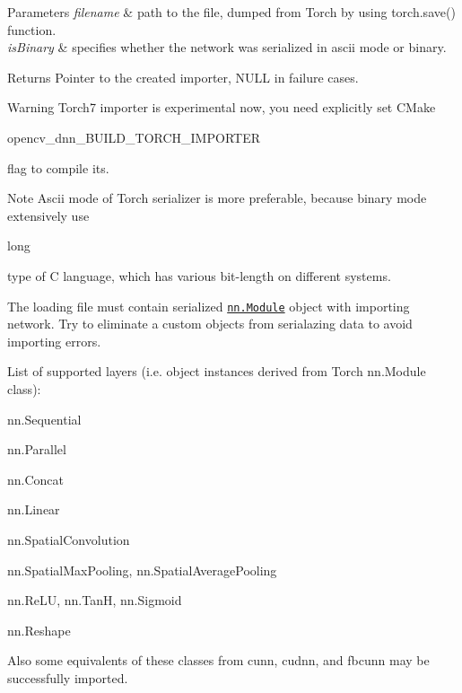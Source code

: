 \begin{DoxyParams}{Parameters}
{\em filename} & path to the file, dumped from Torch by using torch.\+save() function. \\
\hline
{\em is\+Binary} & specifies whether the network was serialized in ascii mode or binary. \\
\hline
\end{DoxyParams}
\begin{DoxyReturn}{Returns}
Pointer to the created importer, N\+U\+LL in failure cases.
\end{DoxyReturn}
\begin{DoxyWarning}{Warning}
Torch7 importer is experimental now, you need explicitly set C\+Make
\begin{DoxyCode}
opencv\_dnn\_BUILD\_TORCH\_IMPORTER 
\end{DoxyCode}
 flag to compile its.
\end{DoxyWarning}
\begin{DoxyNote}{Note}
Ascii mode of Torch serializer is more preferable, because binary mode extensively use
\begin{DoxyCode}
\textcolor{keywordtype}{long} 
\end{DoxyCode}
 type of C language, which has various bit-\/length on different systems.
\end{DoxyNote}
The loading file must contain serialized \href{https://github.com/torch/nn/blob/master/doc/module.md}{\tt nn.\+Module} object with importing network. Try to eliminate a custom objects from serialazing data to avoid importing errors.

List of supported layers (i.\+e. object instances derived from Torch nn.\+Module class)\+:
\begin{DoxyItemize}
\item nn.\+Sequential
\item nn.\+Parallel
\item nn.\+Concat
\item nn.\+Linear
\item nn.\+Spatial\+Convolution
\item nn.\+Spatial\+Max\+Pooling, nn.\+Spatial\+Average\+Pooling
\item nn.\+Re\+LU, nn.\+TanH, nn.\+Sigmoid
\item nn.\+Reshape
\end{DoxyItemize}

Also some equivalents of these classes from cunn, cudnn, and fbcunn may be successfully imported. \mbox{\label{group__dnn_ga228b1b00210018ec3f301f017a00949f}} 
